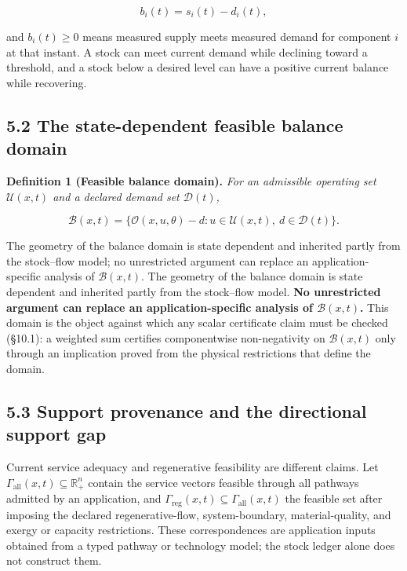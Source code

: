 \documentclass[11pt]{article}
\begin{document}
$$b_i(t) = s_i(t) - d_i(t),$$

 and \(b_i(t) \ge 0\) means measured supply meets measured demand for component \(i\) at that instant. A stock can meet current demand while declining toward a threshold, and a stock below a desired level can have a positive current balance while recovering.

\subsection*{5.2 The state-dependent feasible balance domain}\label{52-the-state-dependent-feasible-balance-domain}

\textbf{Definition 1 (Feasible balance domain).} \emph{For an admissible operating set \(\mathcal{U}(x,t)\) and a declared demand set \(\mathcal{D}(t)\),} 

$$\mathcal{B}(x,t) = \{ \mathcal{O}(x,u,\theta) - d : u \in \mathcal{U}(x,t),\ d \in \mathcal{D}(t) \}.$$



The geometry of the balance domain is state dependent and inherited partly from the stock--flow model; no unrestricted argument can replace an application-specific analysis of \(\mathcal{B}(x,t)\). The geometry of the balance domain is state dependent and inherited partly from the stock--flow model. \textbf{No unrestricted argument can replace an application-specific analysis of \(\mathcal B(x,t)\).} This domain is the object against which any scalar certificate claim must be checked (\S10.1): a weighted sum certifies componentwise non-negativity on \(\mathcal B(x,t)\) only through an implication proved from the physical restrictions that define the domain.

\subsection*{5.3 Support provenance and the directional support gap}\label{53-support-provenance-and-the-directional-support-gap}

Current service adequacy and regenerative feasibility are different claims. Let \(\Gamma_{\mathrm{all}}(x,\allowbreak{}t) \subseteq \mathbb{R}^n_+\allowbreak{}\) contain the service vectors feasible through all pathways admitted by an application, and \(\Gamma_{\mathrm{reg}}(x,\allowbreak{}t) \subseteq \Gamma_{\mathrm{all}}(x,\allowbreak{}t)\) the feasible set after imposing the declared regenerative-flow, system-boundary, material-quality, and exergy or capacity restrictions. These correspondences are application inputs obtained from a typed pathway or technology model; the stock ledger alone does not construct them.
\end{document}

